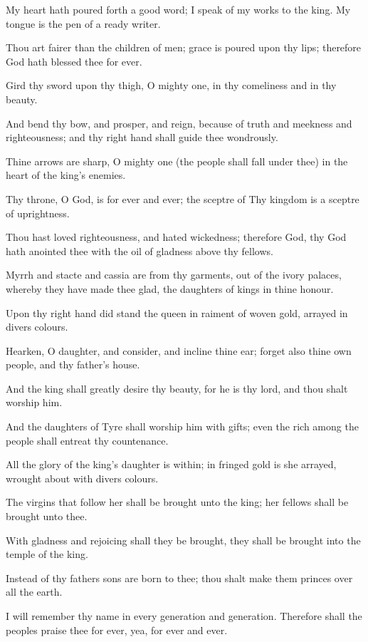 My heart hath poured forth a good word; I speak of my works to the king. My tongue is the pen of a ready writer.

Thou art fairer than the children of men; grace is poured upon thy lips; therefore God hath blessed thee for ever.

Gird thy sword upon thy thigh, O mighty one, in thy comeliness and in thy beauty.

And bend thy bow, and prosper, and reign, because of truth and meekness and righteousness; and thy right hand shall guide thee wondrously.

Thine arrows are sharp, O mighty one (the people shall fall under thee) in the heart of the king’s enemies.

Thy throne, O God, is for ever and ever; the sceptre of Thy kingdom is a sceptre of uprightness.

Thou hast loved righteousness, and hated wickedness; therefore God, thy God hath anointed thee with the oil of gladness above thy fellows.

Myrrh and stacte and cassia are from thy garments, out of the ivory palaces, whereby they have made thee glad, the daughters of kings in thine honour.

Upon thy right hand did stand the queen in raiment of woven gold, arrayed in divers colours.

Hearken, O daughter, and consider, and incline thine ear; forget also thine own people, and thy father's house.

And the king shall greatly desire thy beauty, for he is thy lord, and thou shalt worship him.

And the daughters of Tyre shall worship him with gifts; even the rich among the people shall entreat thy countenance.

All the glory of the king’s daughter is within; in fringed gold is she arrayed, wrought about with divers colours.

The virgins that follow her shall be brought unto the king; her fellows shall be brought unto thee.

With gladness and rejoicing shall they be brought, they shall be brought into the temple of the king.

Instead of thy fathers sons are born to thee; thou shalt make them princes over all the earth.

I will remember thy name in every generation and generation. Therefore shall the peoples praise thee for ever, yea, for ever and ever.
